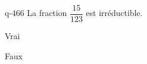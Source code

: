 \begin{truefalse}{q-466}
La fraction $\dfrac{15}{123}$ est irréductible.
\item Vrai
\item* Faux
\end{truefalse}

